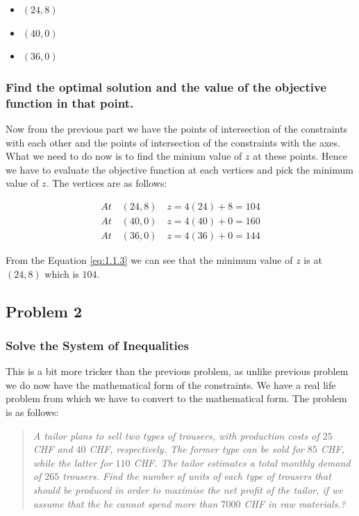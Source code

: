 \documentclass[unicode,11pt,a4paper,oneside,numbers=endperiod,openany]{scrartcl}
\begin{document}
\begin{itemize}
	\item $(24, 8)$
	\item $(40, 0)$
	\item $(36, 0)$
\end{itemize}

\subsubsection{ Find the optimal solution and the value of the objective function in that point.}
Now from the previous part we have the points of intersection of the constraints with each other and the points of intersection of the constraints with the axes. What we need to do now is to find the minium value of $z$ at these points. Hence we have to evaluate the objective function at each vertices and pick the minimum value of $z$. The vertices are as follows:

\begin{equation}
	\begin{aligned}
		At \quad (24, 8) \quad z = 4(24) + 8 = 104 \\
		At \quad (40, 0) \quad z = 4(40) + 0 = 160 \\
		At \quad (36, 0) \quad z = 4(36) + 0 = 144
	\end{aligned}
	\label{eq:1.1.3}
\end{equation}

From the Equation \ref{eq:1.1.3} we can see that the minimum value of $z$ is at $(24, 8)$ which is $104$.

\subsection{Problem 2}
\subsubsection{Solve the System of Inequalities}
This is a bit more tricker than the previous problem, as unlike previous problem we do now have the mathematical form of the constraints. We have a real life problem from which we have to convert to the mathematical form. The problem is as follows:

\begin{quote}
	\textit{A tailor plans to sell two types of trousers, with production costs of $25 $ CHF and $40$ CHF, respectively. The former type can be sold for $85$ CHF, while the latter for $110$ CHF. The tailor estimates a total monthly demand of $265$ trousers. Find the number of units of each type of trousers that should be produced in order to maximise the net proﬁt of the tailor, if we assume that the he cannot spend more than $7000$ CHF in raw materials.?}
\end{quote}
\end{document}
